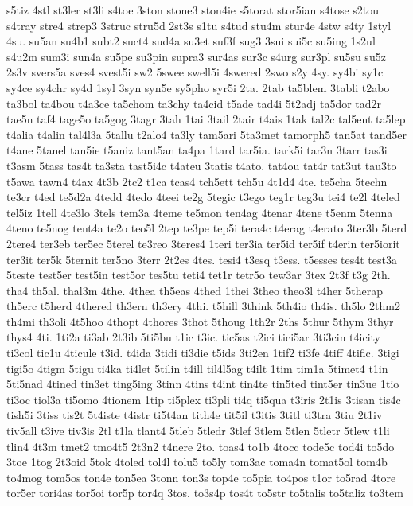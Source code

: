 {s5tiz
4stl
st3ler
st3li
s4toe
3ston
stone3
ston4ie
s5torat
stor5ian
s4tose
s2tou
s4tray
stre4
strep3
3struc
stru5d
2st3s
s1tu
s4tud
stu4m
stur4e
4stw
s4ty
1styl
4su.
su5an
su4b1
subt2
suct4
sud4a
su3et
suf3f
sug3
3sui
sui5c
su5ing
1s2ul
s4u2m
sum3i
sun4a
su5pe
su3pin
supra3
sur4as
sur3c
s4urg
sur3pl
su5su
su5z
2s3v
svers5a
sves4
svest5i
sw2
5swee
swell5i
4swered
2swo
s2y
4sy.
sy4bi
sy1c
sy4ce
sy4chr
sy4d
1syl
3syn
syn5e
sy5pho
syr5i
2ta.
2tab
ta5blem
3tabli
t2abo
ta3bol
ta4bou
t4a3ce
ta5chom
ta3chy
ta4cid
t5ade
tad4i
5t2adj
ta5dor
tad2r
tae5n
taf4
tage5o
ta5gog
3tagr
3tah
1tai
3tail
2tair
t4ais
1tak
tal2c
tal5ent
ta5lep
t4alia
t4alin
tal4l3a
5tallu
t2alo4
ta3ly
tam5ari
5ta3met
tamorph5
tan5at
tand5er
t4ane
5tanel
tan5ie
t5aniz
tant5an
ta4pa
1tard
tar5ia.
tark5i
tar3n
3tarr
tas3i
t3asm
5tass
tas4t
ta3sta
tast5i4c
t4ateu
3tatis
t4ato.
tat4ou
tat4r
tat3ut
tau3to
t5awa
tawn4
t4ax
4t3b
2tc2
t1ca
tcas4
tch5ett
tch5u
4t1d4
4te.
te5cha
5techn
te3cr
t4ed
te5d2a
4tedd
4tedo
4teei
te2g
5tegic
t3ego
teg1r
teg3u
tei4
te2l
4teled
tel5iz
1tell
4te3lo
3tels
tem3a
4teme
te5mon
ten4ag
4tenar
4tene
t5enm
5tenna
4teno
te5nog
tent4a
te2o
teo5l
2tep
te3pe
tep5i
tera4c
t4erag
t4erato
3ter3b
5terd
2tere4
ter3eb
ter5ec
5terel
te3reo
3teres4
1teri
ter3ia
ter5id
ter5if
t4erin
ter5iorit
ter3it
ter5k
5ternit
ter5no
3terr
2t2es
4tes.
tesi4
t3esq
t3ess.
t5esses
tes4t
test3a
5teste
test5er
test5in
test5or
tes5tu
teti4
tet1r
tetr5o
tew3ar
3tex
2t3f
t3g
2th.
tha4
th5al.
thal3m
4the.
4thea
th5eas
4thed
1thei
3theo
theo3l
t4her
5therap
th5erc
t5herd
4thered
th3ern
th3ery
4thi.
t5hill
3think
5th4io
th4is.
th5lo
2thm2
th4mi
th3oli
4t5hoo
4thopt
4thores
3thot
5thoug
1th2r
2ths
5thur
5thym
3thyr
thys4
4ti.
1ti2a
ti3ab
2t3ib
5ti5bu
t1ic
t3ic.
tic5as
t2ici
tici5ar
3ti3cin
t4icity
ti3col
tic1u
4ticule
t3id.
t4ida
3tidi
ti3die
t5ids
3ti2en
1tif2
ti3fe
4tiff
4tific.
3tigi
tigi5o
4tigm
5tigu
ti4ka
ti4let
5tilin
t4ill
til4l5ag
t4ilt
1tim
tim1a
5timet4
t1in
5ti5nad
4tined
tin3et
ting5ing
3tinn
4tins
t4int
tin4te
tin5ted
tint5er
tin3ue
1tio
ti3oc
tiol3a
ti5omo
4tionem
1tip
ti5plex
ti3pli
ti4q
ti5qua
t3iris
2t1is
3tisan
tis4c
tish5i
3tiss
tis2t
5t4iste
t4istr
ti5t4an
tith4e
tit5il
t3itis
3titl
ti3tra
3tiu
2t1iv
tiv5all
t3ive
tiv3is
2tl
t1la
tlant4
5tleb
5tledr
3tlef
3tlem
5tlen
5tletr
5tlew
t1li
tlin4
4t3m
tmet2
tmo4t5
2t3n2
t4nere
2to.
toas4
to1b
4tocc
tode5c
tod4i
to5do
3toe
1tog
2t3oid
5tok
4toled
tol4l
tolu5
to5ly
tom3ac
toma4n
tomat5ol
tom4b
to4mog
tom5os
ton4e
ton5ea
3tonn
ton3s
top4e
to5pia
to4pos
t1or
to5rad
4tore
tor5er
tori4as
tor5oi
tor5p
tor4q
3tos.
to3s4p
tos4t
to5str
to5talis
to5taliz
to3tem
}
